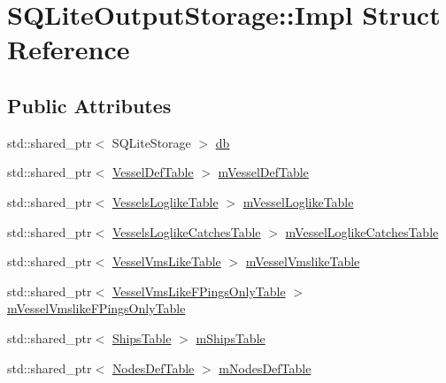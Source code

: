 \hypertarget{struct_s_q_lite_output_storage_1_1_impl}{}\section{S\+Q\+Lite\+Output\+Storage\+::Impl Struct Reference}
\label{struct_s_q_lite_output_storage_1_1_impl}
\subsection*{Public Attributes}
\begin{DoxyCompactItemize}
\item 
std\+::shared\+\_\+ptr$<$ S\+Q\+Lite\+Storage $>$ \mbox{\hyperlink{struct_s_q_lite_output_storage_1_1_impl_aca7d67b5895388ca2dcf304188faa0bc}{db}}
\item 
std\+::shared\+\_\+ptr$<$ \mbox{\hyperlink{class_vessel_def_table}{Vessel\+Def\+Table}} $>$ \mbox{\hyperlink{struct_s_q_lite_output_storage_1_1_impl_af3681070b65ea9948dda6a49ba1fbf89}{m\+Vessel\+Def\+Table}}
\item 
std\+::shared\+\_\+ptr$<$ \mbox{\hyperlink{class_vessels_loglike_table}{Vessels\+Loglike\+Table}} $>$ \mbox{\hyperlink{struct_s_q_lite_output_storage_1_1_impl_a613ffd9b1ca666314420ec0e4dceeb7a}{m\+Vessel\+Loglike\+Table}}
\item 
std\+::shared\+\_\+ptr$<$ \mbox{\hyperlink{class_vessels_loglike_catches_table}{Vessels\+Loglike\+Catches\+Table}} $>$ \mbox{\hyperlink{struct_s_q_lite_output_storage_1_1_impl_ac8fdf3de88ce901970e611a0d9c735ff}{m\+Vessel\+Loglike\+Catches\+Table}}
\item 
std\+::shared\+\_\+ptr$<$ \mbox{\hyperlink{class_vessel_vms_like_table}{Vessel\+Vms\+Like\+Table}} $>$ \mbox{\hyperlink{struct_s_q_lite_output_storage_1_1_impl_a6e1423fa8febd4779ba3f02e8f1beba0}{m\+Vessel\+Vmslike\+Table}}
\item 
std\+::shared\+\_\+ptr$<$ \mbox{\hyperlink{class_vessel_vms_like_f_pings_only_table}{Vessel\+Vms\+Like\+F\+Pings\+Only\+Table}} $>$ \mbox{\hyperlink{struct_s_q_lite_output_storage_1_1_impl_a998c9241a0ae8cb8a00fac87a9793662}{m\+Vessel\+Vmslike\+F\+Pings\+Only\+Table}}
\item 
std\+::shared\+\_\+ptr$<$ \mbox{\hyperlink{class_ships_table}{Ships\+Table}} $>$ \mbox{\hyperlink{struct_s_q_lite_output_storage_1_1_impl_a80950743f42bd09c315fb8126c9ec961}{m\+Ships\+Table}}
\item 
std\+::shared\+\_\+ptr$<$ \mbox{\hyperlink{class_nodes_def_table}{Nodes\+Def\+Table}} $>$ \mbox{\hyperlink{struct_s_q_lite_output_storage_1_1_impl_a1fe0a82bd80e4c1244d6237a114b6119}{m\+Nodes\+Def\+Table}}

\end{DoxyCompactItemize}
